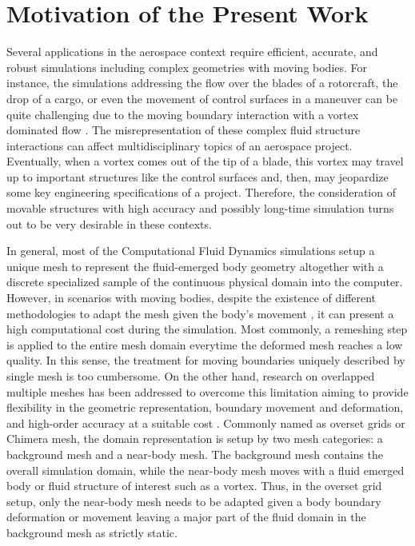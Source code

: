 \section{Motivation of the Present Work}
Several applications in the aerospace context require efficient, accurate, and robust simulations including complex geometries with moving bodies. For instance, the simulations addressing the flow over the blades of a rotorcraft, the drop of a cargo, or even the movement of control surfaces in a maneuver can be quite challenging due to the moving boundary interaction with a vortex dominated flow \cite{Rockwell1998, Abras2007, Costes2012}. The misrepresentation of these complex fluid structure interactions can affect multidisciplinary topics of an aerospace project. Eventually, when a vortex comes out of the tip of a blade, this vortex may travel up to important structures like the control surfaces and, then, may jeopardize some key engineering specifications of a project. Therefore, the consideration of movable structures with high accuracy and possibly long-time simulation turns out to be very desirable in these contexts.

In general, most of the Computational Fluid Dynamics simulations setup a unique mesh to represent the fluid-emerged body geometry altogether with a discrete specialized sample of the continuous physical domain into the computer. However, in scenarios with moving bodies, despite the existence of different methodologies to adapt the mesh given the body's movement \cite{Powell1993, Persson2005}, it can present a high computational cost during the simulation. Most commonly, a remeshing step is applied to the entire mesh domain everytime the deformed mesh reaches a low quality. In this sense, the treatment for moving boundaries uniquely described by single mesh is too cumbersome. On the other hand, research on overlapped multiple meshes has been addressed to overcome this limitation aiming to provide flexibility in the geometric representation, boundary movement and deformation, and high-order accuracy at a suitable cost \cite{Galbraith2013, Crabill2018, DuanThesis2019, Duan2020}. Commonly named as overset grids or Chimera mesh, the domain representation is setup by two mesh categories: a background mesh and a near-body mesh. The background mesh contains the overall simulation domain, while the near-body mesh moves with a fluid emerged body or fluid structure of interest such as a vortex. Thus, in the overset grid setup, only the near-body mesh needs to be adapted given a body boundary deformation or movement leaving a major part of the fluid domain in the background mesh as strictly static. 

